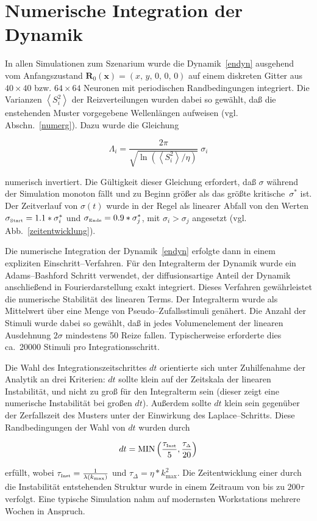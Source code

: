 \section{Numerische Integration der Dynamik}
\label{anhang2}
\thispagestyle{plain}

In allen Simulationen zum Szenarium wurde die Dynamik~\eqref{endyn}
ausgehend vom Anfangszustand $\mathbf{R}_0(\mathbf{x}) = (x,\, y,\, 0,\,
0,\, 0) $ auf einem diskreten Gitter aus $40\times 40$ bzw. $64\times 64$
Neuronen mit periodischen Randbedingungen integriert.  Die Varianzen
$\left<S_i^2\right>$ der Reizverteilungen wurden dabei so gewählt, daß
die enstehenden Muster vorgegebene Wellenlängen aufweisen
(vgl. Abschn.~\ref{numerg}). Dazu wurde die Gleichung

\begin{equation*}
\Lambda_i = \frac{2 \pi}{\sqrt{\ln\left(\left<S_i^2\right>/\eta\right)}}\;\sigma_i
\end{equation*}

\noindent numerisch invertiert.  Die Gültigkeit dieser Gleichung
erfordert, daß $\sigma$ während der Simulation monoton fällt und zu
Beginn größer als das größte kritische~$\sigma^\ast$ ist.  Der
Zeitverlauf von $\sigma(t)$ wurde in der Regel als linearer Abfall von den
Werten $\sigma_{\mbox{\tiny Start}}=1.1*\sigma_i^\ast$ und
$\sigma_{\mbox{\tiny Ende}}=0.9*\sigma_j^\ast$, mit
$\sigma_i>\sigma_j$ angesetzt (vgl. Abb.~\ref{zeitentwicklung}).

Die numerische Integration der Dynamik~\eqref{endyn} erfolgte dann in einem
expliziten Einschritt--Verfahren. Für den Integralterm der Dynamik wurde
ein Adams--Bashford Schritt verwendet, der diffusionsartige Anteil der
Dynamik anschließend in Fourierdarstellung exakt integriert.  Dieses
Verfahren gewährleistet die numerische Stabilität des linearen Terms.
Der Integralterm wurde als Mittelwert über eine Menge von
Pseudo--Zufallsstimuli genähert. Die Anzahl der Stimuli wurde dabei so
gewählt, daß in jedes Volumenelement der linearen Ausdehnung $2\sigma$
mindestens 50 Reize fallen. Typischerweise erforderte dies ca.~20000
Stimuli pro Integrationsschritt.

Die Wahl des Integrationszeitschrittes $dt$ orientierte sich unter
Zuhilfenahme der Analytik an drei Kriterien: $dt$ sollte klein auf der
Zeitskala der linearen Instabilität, und nicht zu groß für den
Integralterm sein (dieser zeigt eine numerische Instabilität bei großen
$dt$). Außerdem sollte $dt$ klein sein gegenüber der Zerfallszeit des
Musters unter der Einwirkung des Laplace--Schritts. Diese Randbedingungen
der Wahl von $dt$ wurden durch

\begin{equation*}
dt = \text{MIN}\left(\frac{\tau_{\mbox{\tiny
Inst}}}{5},\frac{\tau_{\scriptscriptstyle \Delta}}{20}\right)
\end{equation*}

\noindent erfüllt, wobei $\tau_{\mbox{\tiny
Inst}}=\frac{1}{\lambda(k_{\text{max}})}$ und $\tau_{\scriptscriptstyle
\Delta}=\eta*k_{\text{max}}^2$.  Die Zeitentwicklung einer durch die
Instabilität entstehenden Struktur wurde in einem Zeitraum von bis zu
$200\tau$ verfolgt. Eine typische Simulation nahm auf modernsten
Workstations mehrere Wochen in Anspruch.
